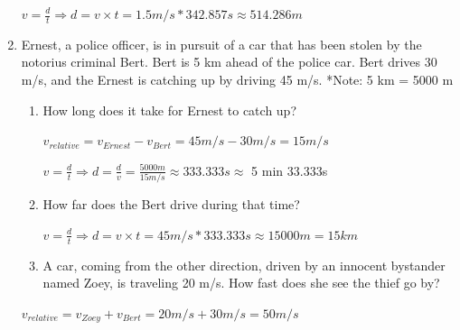 \documentclass[letterpaper, 12pt]{article}
\begin{document}
\begin{enumerate}
\begin{enumerate}
	
\end{enumerate}

\color{red}
\begin{center}	
	$ v = \frac{d}{t} \Longrightarrow d = v \times t = 1.5 m/s * 342.857s \approx 514.286 m $
	\vspace{0.15in}
	
\end{center}


\color{black}


\item Ernest, a police officer, is in pursuit of a car that has been stolen by the notorius criminal Bert.  Bert is 5 km ahead of the police car.  Bert drives 30 m/s, and the Ernest is catching up by driving 45 m/s. \color{red} *Note: 5 km = 5000 m \color{black}
\begin{enumerate}
	\item How long does it take for Ernest to catch up?
			\color{red}
		\begin{center} $ v_{relative} = v_{Ernest} - v_{Bert} = 45 m/s - 30 m/s = 15 m/s $
			
			\vspace{0.15in}
			$	v = \frac{d}{t} \Longrightarrow d = \frac{d}{v} = \frac{5000m}{15 m/s} \approx 333.333s \approx $  5 min 33.333s
			
		\end{center}
		\color{black}
		
	\item How far does the Bert drive during that time?
	
	\color{red}
	\begin{center}	
		$ v = \frac{d}{t} \Longrightarrow d = v \times t = 45 m/s * 333.333s \approx 15000 m = 15 km $
		\vspace{0.15in}
		
	\end{center}
	
	
	\color{black}

	\item A car, coming from the other direction, driven by an innocent bystander named Zoey, is traveling 20 m/s.  How fast does she see the thief go by?
\end{enumerate}

\color{red}
\begin{center} $ v_{relative} = v_{Zoey} + v_{Bert} = 20 m/s + 30 m/s = 50 m/s $
	
\end{center}
\vspace{1.5in}
\color{black}


\end{enumerate}
\end{document}
